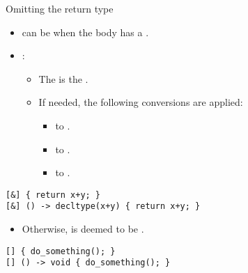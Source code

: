 \begin{frame}[t,fragile]{Omitting the return type}
\begin{itemize}
  \item {} can be 
        when the body has a .
\end{itemize}

\pause
\begin{itemize}
  \item {}:
  \begin{itemize}
    \item The  is the .
    \item If needed, the following conversions are applied:
      \begin{itemize}
        \item {} to .
        \item {} to .
        \item {} to .
      \end{itemize}
  \end{itemize}
\end{itemize}

\begin{lstlisting}
[&] { return x+y; }
[&] () -> decltype(x+y) { return x+y; }
\end{lstlisting}

\pause
  \begin{itemize}
    \item Otherwise,  is deemed to be .
  \end{itemize}
\begin{lstlisting}
[] { do_something(); }
[] () -> void { do_something(); }
\end{lstlisting}
\end{frame}


